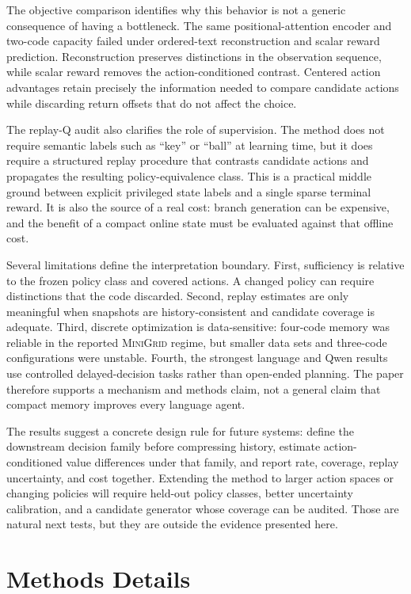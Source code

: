 \documentclass[11pt]{article}
\newcommand{\minigrid}{\textsc{MiniGrid}}
\begin{document}
The objective comparison identifies why this behavior is not a generic consequence of having a bottleneck. The same positional-attention encoder and two-code capacity failed under ordered-text reconstruction and scalar reward prediction. Reconstruction preserves distinctions in the observation sequence, while scalar reward removes the action-conditioned contrast. Centered action advantages retain precisely the information needed to compare candidate actions while discarding return offsets that do not affect the choice.

The replay-Q audit also clarifies the role of supervision. The method does not require semantic labels such as ``key'' or ``ball'' at learning time, but it does require a structured replay procedure that contrasts candidate actions and propagates the resulting policy-equivalence class. This is a practical middle ground between explicit privileged state labels and a single sparse terminal reward. It is also the source of a real cost: branch generation can be expensive, and the benefit of a compact online state must be evaluated against that offline cost.

Several limitations define the interpretation boundary. First, sufficiency is relative to the frozen policy class and covered actions. A changed policy can require distinctions that the code discarded. Second, replay estimates are only meaningful when snapshots are history-consistent and candidate coverage is adequate. Third, discrete optimization is data-sensitive: four-code memory was reliable in the reported \minigrid{} regime, but smaller data sets and three-code configurations were unstable. Fourth, the strongest language and Qwen results use controlled delayed-decision tasks rather than open-ended planning. The paper therefore supports a mechanism and methods claim, not a general claim that compact memory improves every language agent.

The results suggest a concrete design rule for future systems: define the downstream decision family before compressing history, estimate action-conditioned value differences under that family, and report rate, coverage, replay uncertainty, and cost together. Extending the method to larger action spaces or changing policies will require held-out policy classes, better uncertainty calibration, and a candidate generator whose coverage can be audited. Those are natural next tests, but they are outside the evidence presented here.

\section{Methods Details}
\end{document}
